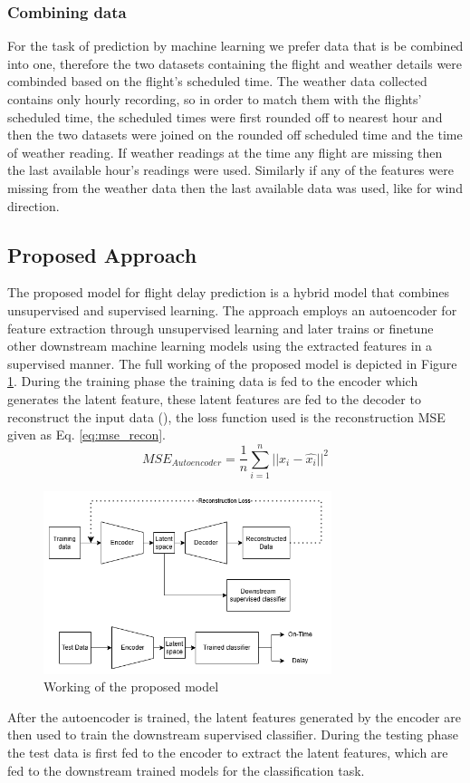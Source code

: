 \documentclass[twoside,11pt]{article}
\begin{document}
\subsubsection{Combining data}

For the task of prediction by machine learning we prefer data that is be combined into one, therefore the two datasets containing the flight and weather details were combinded based on the flight's scheduled time. The weather data collected contains only hourly recording, so in order to match them with the flights' scheduled time, the scheduled times were first rounded off to nearest hour and then the two datasets were joined on the rounded off scheduled time and the time of weather reading. If weather readings at the time any flight are missing then the last available hour's readings were used. Similarly if any of the features were missing from the weather data then the last available data was used, like for wind direction.

\subsection{Proposed Approach}
The proposed model for flight delay prediction is a hybrid model that combines unsupervised and supervised learning. The approach employs an autoencoder for feature extraction through unsupervised learning and later trains or finetune other downstream machine learning models using the extracted features in a supervised manner. The full working of the proposed model is depicted in Figure \ref{fig:model}. During the training phase the training data is fed to the encoder which generates the latent feature, these latent features are fed to the decoder to reconstruct the input data (\citealp{hintonReducingDimensionalityData2006}), the loss function used is the reconstruction MSE given as Eq. \ref{eq:mse_recon}. 
\begin{equation}
  \label{eq:mse_recon}
  MSE_{Autoencoder} = \frac{1}{n} \sum_{i=1}^{n} ||x_i - \hat{x_i}||^2
\end{equation}
\begin{figure}
  \centering
  \includegraphics[width=0.75\textwidth]{images/model.png}
  \caption{Working of the proposed model}
  \label{fig:model}
\end{figure}
After the autoencoder is trained, the latent features generated by the encoder are then used to train the downstream supervised classifier. During the testing phase the test data is first fed to the encoder to extract the latent features, which are fed to the downstream trained models for the classification task.
\end{document}
